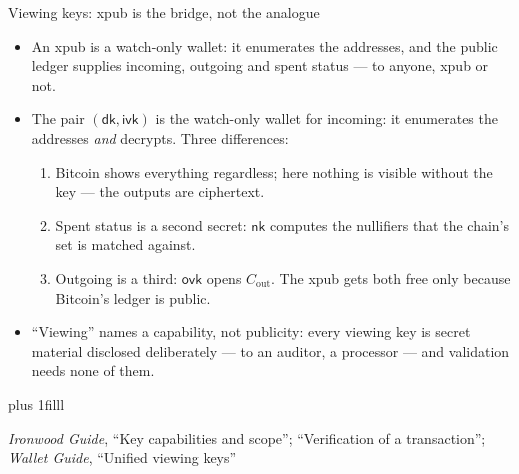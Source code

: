 \documentclass[aspectratio=169,11pt]{beamer}
\newcommand{\nksym}{\ensuremath{\mathsf{nk}}}
\newcommand{\ivk}{\ensuremath{\mathsf{ivk}}}
\newcommand{\ovk}{\ensuremath{\mathsf{ovk}}}
\newcommand{\dk}{\ensuremath{\mathsf{dk}}}
\newcommand{\src}[1]{\par\vskip0pt plus 1filll
  {\fontsize{6}{7.2}\selectfont\color{arbdim}\raggedright #1\par}}
\begin{document}
\begin{frame}{Viewing keys: xpub is the bridge, not the analogue}
\begin{itemize}
  \item An xpub is a watch-only wallet: it enumerates the addresses, and
    the public ledger supplies incoming, outgoing and spent status ---
    to anyone, xpub or not.
  \item The pair $(\dk, \ivk)$ is the watch-only wallet for incoming: it
    enumerates the addresses \emph{and} decrypts. Three differences:
  \begin{enumerate}
    \item Bitcoin shows everything regardless; here nothing is visible
      without the key --- the outputs are ciphertext.
    \item Spent status is a second secret: \nksym{} computes the
      nullifiers that the chain's set is matched against.
    \item Outgoing is a third: \ovk{} opens $C_{\mathrm{out}}$. The xpub
      gets both free only because Bitcoin's ledger is public.
  \end{enumerate}
  \item ``Viewing'' names a capability, not publicity: every viewing key
    is secret material disclosed deliberately --- to an auditor, a
    processor --- and validation needs none of them.
\end{itemize}
\src{\emph{Ironwood Guide}, ``Key capabilities and scope''; ``Verification of a
transaction''; \emph{Wallet Guide}, ``Unified viewing keys''}
\end{frame}
\end{document}
